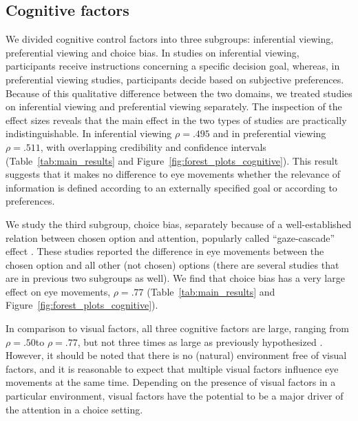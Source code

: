 \documentclass{article}
\begin{document}
\subsection{Cognitive factors}

We divided cognitive control factors into three subgroups: inferential viewing, preferential viewing and choice bias. In studies on inferential viewing, participants receive instructions concerning a specific decision goal, whereas, in preferential viewing studies, participants decide based on subjective preferences. Because of this qualitative difference between the two domains, we treated studies on inferential viewing and preferential viewing separately. The inspection of the effect sizes reveals that the main effect in the two types of studies are practically indistinguishable. In inferential viewing $\rho = .495$ and in preferential viewing $\rho = .511$, with overlapping credibility and confidence intervals (Table~\ref{tab:main_results} and Figure~\ref{fig:forest_plots_cognitive}). This result suggests that it makes no difference to eye movements whether the relevance of information is defined according to an externally specified goal or according to preferences. 

We study the third subgroup, choice bias, separately because of a well-established relation between chosen option and attention, popularly called ``gaze-cascade'' effect \citep{shimojo2003a}. These studies reported the difference in eye movements between the chosen option and all other (not chosen) options (there are several studies that are in previous two subgroups as well). We find that choice bias has a very large effect on eye movements, $\rho = .77$ (Table~\ref{tab:main_results} and Figure~\ref{fig:forest_plots_cognitive}). %

In comparison to visual factors, all three cognitive factors are large, ranging from $\rho = .50$to $\rho = .77$, but not three times as large as previously hypothesized \citep{wedel2006chapter}. However, it should be noted that there is no (natural) environment free of visual factors, and it is reasonable to expect that multiple visual factors influence eye movements at the same time. Depending on the presence of visual factors in a particular environment, visual factors have the potential to be a major driver of the attention in a choice setting.
\end{document}
